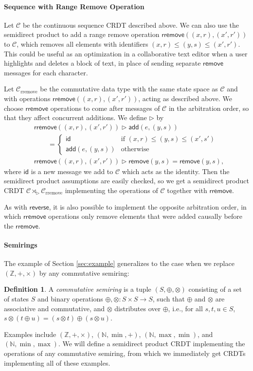 \documentclass[acmsmall,nonacm]{acmart}
\newcommand{\mc}[1]{\ensuremath{\mathcal{#1}}}
\newcommand{\mb}[1]{\ensuremath{\mathbb{#1}}}
\newcommand{\msf}[1]{\ensuremath{\mathsf{#1}}}
\newcommand{\ra}{\rightarrow}
\newcommand{\act}{\triangleright}
\newcommand{\N}{\mb{N}}
\newcommand{\Z}{\mb{Z}}
\theoremstyle{plain}
\theoremstyle{definition}
\newtheorem{mydef}[mythm]{Definition}
\begin{document}
\paragraph{Sequence with Range Remove Operation}
Let $\mc{C}$ be the continuous sequence CRDT described above.  We can also use the semidirect product to add a range remove operation $\msf{rremove}((x, r), (x', r'))$ to $\mc{C}$, which removes all elements with identifiers $(x, r) \le (y, s) \le (x', r')$.  This could be useful as an optimization in a collaborative text editor when a user highlights and deletes a block of text, in place of sending separate $\msf{remove}$ messages for each character.

Let $\mc{C}_{\text{rremove}}$ be the commutative data type with the same state space as $\mc{C}$ and with operations $\msf{rremove}((x, r), (x', r'))$, acting as described above.  We choose $\msf{rremove}$ operations to come after messages of $\mc{C}$ in the arbitration order, so that they affect concurrent additions.  We define $\act$ by
\begin{align*}
&\msf{rremove}((x, r), (x', r')) \act \msf{add}(e, (y, s)) \\
&\qquad = \begin{cases} \msf{id} &\mbox{if $(x, r) \le (y, s) \le (x', s')$} \\ \msf{add}(e, (y, s)) &\mbox{otherwise} \end{cases}
\\
&\msf{rremove}((x, r), (x', r')) \act \msf{remove}(y, s) = \msf{remove}(y, s),
\end{align*}
where $\msf{id}$ is a new message we add to $\mc{C}$ which acts as the identity.  Then the semidirect product assumptions are easily checked, so we get a semidirect product CRDT $\mc{C} \rtimes_\act \mc{C}_{\text{rremove}}$ implementing the operations of $\mc{C}$ together with $\msf{rremove}$.

As with $\msf{reverse}$, it is also possible to implement the opposite arbitration order, in which $\msf{rremove}$ operations only remove elements that were added causally before the $\msf{rremove}$.



\paragraph{Semirings}
The example of Section \ref{sec:example} generalizes to the case when we replace $(\Z, +, \times)$ by any commutative semiring:
\begin{mydef}
A \textit{commutative semiring} \cite{semiring} is a tuple $(S, \oplus, \otimes)$ consisting of a set of states $S$ and binary operations $\oplus, \otimes: S \times S \ra S$, such that $\oplus$ and $\otimes$ are associative and commutative, and $\otimes$ distributes over $\oplus$, i.e., for all $s, t, u \in S$, $s \otimes (t \oplus u) = (s \otimes t) \oplus (s \otimes u)$.
\end{mydef}
Examples include $(\Z, +, \times)$, $(\N, \min, +)$, $(\N, \max, \min)$, and $(\N, \min, \max)$.  We will define a semidirect product CRDT implementing the operations of any commutative semiring, from which we immediately get CRDTs implementing all of these examples.
\end{document}
